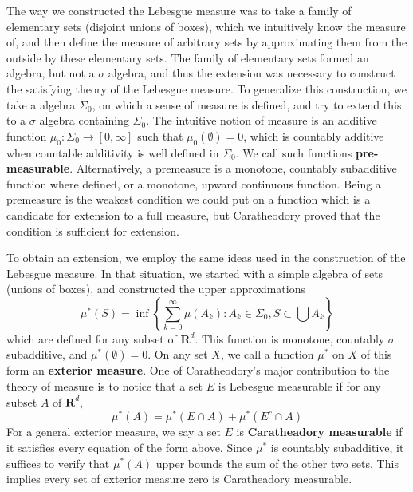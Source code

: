 The way we constructed the Lebesgue measure was to take a family of elementary sets (disjoint unions of boxes), which we intuitively know the measure of, and then define the measure of arbitrary sets by approximating them from the outside by these elementary sets. The family of elementary sets formed an algebra, but not a $\sigma$ algebra, and thus the extension was necessary to construct the satisfying theory of the Lebesgue measure. To generalize this construction, we take a algebra $\Sigma_0$, on which a sense of measure is defined, and try to extend this to a $\sigma$ algebra containing $\Sigma_0$. The intuitive notion of measure is an additive function $\mu_0: \Sigma_0 \to [0,\infty]$  such that $\mu_0(\emptyset) = 0$, which is countably additive when countable additivity is well defined in $\Sigma_0$. We call such functions {\bf pre-measurable}. Alternatively, a premeasure is a monotone, countably subadditive function where defined, or a monotone, upward continuous function. Being a premeasure is the weakest condition we could put on a function which is a candidate for extension to a full measure, but Caratheodory proved that the condition is sufficient for extension.

To obtain an extension, we employ the same ideas used in the construction of the Lebesgue measure. In that situation, we started with a simple algebra of sets (unions of boxes), and constructed the upper approximations
%
\[ \mu^*(S) = \inf \left\{ \sum_{k = 0}^\infty \mu(A_k) : A_k \in \Sigma_0, S \subset \bigcup A_k \right\} \]
%
which are defined for any subset of $\mathbf{R}^d$. This function is monotone, countably $\sigma$ subadditive, and $\mu^*(\emptyset) = 0$. On any set $X$, we call a function $\mu^*$ on $X$ of this form an {\bf exterior measure}. One of Caratheodory's major contribution to the theory of measure is to notice that a set $E$ is Lebesgue measurable if for any subset $A$ of $\mathbf{R}^d$,
%
\[ \mu^*(A) = \mu^*(E \cap A) + \mu^*(E^c \cap A) \]
%
For a general exterior measure, we say a set $E$ is {\bf Caratheadory measurable} if it satisfies every equation of the form above. Since $\mu^*$ is countably subadditive, it suffices to verify that $\mu^*(A)$ upper bounds the sum of the other two sets. This implies every set of exterior measure zero is Caratheadory measurable.

